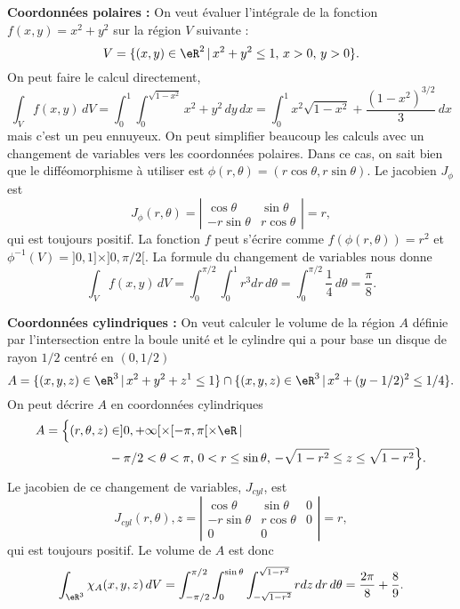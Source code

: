 \begin{example} 
\textbf{Coordonnées polaires : }On veut évaluer l'intégrale de la fonction $f(x,y)= x^2+y^2$ sur la région $V$ suivante :
\[
V=\{(x,y) \in \eR^2\,\vert\, x^2+y^2\leq 1,\, x>0,\, y>0\}.
\]
On peut faire le calcul directement,
\[
\int_{V}f(x,y)\, dV=\int_0^1\int_0^{\sqrt{1-x^2}}x^2+y^2\, dy\,dx=\int_0^1x^2\sqrt{1-x^2} + \frac{(1-x^2)^{3/2}}{3}\, dx  
\] 
mais c'est un peu ennuyeux. On peut simplifier beaucoup les calculs avec un changement de variables vers les coordonnées polaires. Dans ce cas, on sait bien que le difféomorphisme à utiliser est $\phi(r,\theta)=(r\cos \theta, r\sin\theta)$. Le jacobien  $J_{\phi}$ est
\begin{equation}
 J_{\phi}(r, \theta)= \left\vert\begin{array}{cc}
\cos \theta & \sin \theta \\
-r\sin \theta  & r\cos \theta
\end{array}\right\vert= r,
\end{equation}
qui est toujours positif. La fonction $f$ peut s'écrire comme $f(\phi(r,\theta))=r^2$ et $\phi^{-1}(V)=]0,1]\times]0, \pi/2[$.  
La formule du changement de variables nous donne
\[
\int_{V}f(x,y)\, dV=\int_0^{\pi/2}\int_0^{1}r^3 dr\,d\theta=\int_0^{\pi/2}\frac{1}{4}\,d\theta=\frac{\pi}{8}.  
\] 
\end{example}
\begin{example}
\textbf{Coordonnées cylindriques : }On veut calculer le volume de la région $A$ définie par  l'intersection entre la boule unité et le cylindre qui a pour base un disque de rayon $1/2$ centré en $(0, 1/2)$
\[
A=\{(x,y,z) \in\eR^3 \,\vert\, x^2+y^2+z^1\leq 1\}\cap\{(x,y,z) \in \eR^3\,\vert\, x^2+(y-1/2)^2\leq 1/4\}.
\]
On peut décrire $A$ en coordonnées cylindriques
\begin{equation}
  \begin{aligned}
    A=\Big\{(r,\theta,z) &\in ]0, +\infty[\times [-\pi,\pi[\times \eR\,\vert\,\\
& -\pi/2<\theta<\pi, \, 0<r\leq \sin\theta, \, -\sqrt{1-r^2}\leq z\leq\sqrt{1-r^2} \Big\}.
  \end{aligned}
\end{equation}
Le jacobien de ce changement de variables,  $J_{cyl}$, est
\begin{equation}
 J_{cyl}(r, \theta), z= \left\vert\begin{array}{ccc}
\cos \theta & \sin \theta & 0\\
-r\sin \theta  & r\cos \theta &0 \\
0&0&
\end{array}\right\vert= r,
\end{equation}
qui est toujours positif. Le volume de $A$ est donc
\[
\int_{\eR^3}\chi_{A}(x,y,z)\, dV=\int_{-\pi/2}^{\pi/2}\int_0^{\sin\theta}\int_{-\sqrt{1-r^2}}^{\sqrt{1-r^2}} r dz\,dr\,d\theta=\frac{2\pi}{8}+\frac{8}{9}.  
\] 
\end{example}
